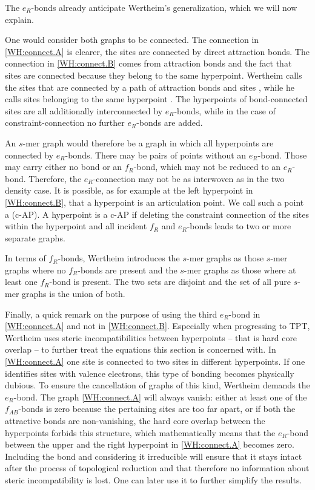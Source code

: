 \documentclass[8.5pt,twoside,twocolumn]{article}
\theoremstyle{standard}
\begin{document}
The $e_R$-bonds already anticipate Wertheim's generalization, which we will now explain.

One would consider both graphs to be connected. The connection in \eqref{WH:connect.A} is clearer,
the sites are connected by direct attraction bonds. The connection in \eqref{WH:connect.B} comes
from attraction bonds and the fact that sites are connected because they belong to the same
hyperpoint. Wertheim calls the sites that are connected by a path of attraction bonds 
and sites , while he calls sites belonging to the same hyperpoint
. The hyperpoints of bond-connected sites are all additionally interconnected
by $e_R$-bonds, while in the case of constraint-connection no further $e_R$-bonds are added.

An $s$-mer graph would therefore be a graph in which all hyperpoints are connected by
$e_R$-bonds. There may be pairs of points without an $e_R$-bond. Those may carry either no bond
or an $f_R$-bond, which may not be reduced to an $e_R$-bond. Therefore, the $e_R$-connection
may not be as interwoven as in the two density case. It is possible, as for example at the
left hyperpoint in \eqref{WH:connect.B}, that a hyperpoint is an articulation point.
We call such a point a  (c-AP).
A hyperpoint is a c-AP if deleting the constraint connection of the sites within
the hyperpoint and all incident $f_R$ and $e_R$-bonds leads to two or more separate graphs.

In terms of $f_R$-bonds, Wertheim introduces the  $s$-mer graphs as those $s$-mer
graphs where no $f_R$-bonds are present and the  $s$-mer graphs as those
where at least one $f_R$-bond is present. The two sets are disjoint and the set of all pure
$s$-mer graphs is the union of both.

Finally, a quick remark on the purpose of using the third $e_R$-bond in \eqref{WH:connect.A} and not
in \eqref{WH:connect.B}. Especially when progressing to TPT, Wertheim uses steric incompatibilities
between hyperpoints -- that is hard core overlap -- to further treat the equations this section
is concerned with. In \eqref{WH:connect.A} one site is connected to two sites in different
hyperpoints. If one identifies sites with valence electrons, this type of bonding becomes
physically dubious. To ensure the cancellation of graphs of this kind, Wertheim demands the
$e_R$-bond. The graph \eqref{WH:connect.A} will always vanish: either at least one of the
$f_{AB}$-bonds is zero because the pertaining sites are too far apart, or if both the attractive
bonds are non-vanishing, the hard core overlap between the hyperpoints forbids this structure,
which mathematically means that the $e_R$-bond between the upper and the right hyperpoint
in \eqref{WH:connect.A} becomes zero. Including the bond and considering it irreducible
will ensure that it stays intact after the process of topological reduction and that
therefore no information about steric incompatibility is lost. One can later use it to
further simplify the results.
\end{document}
